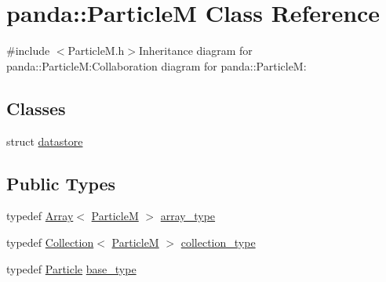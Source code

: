 \hypertarget{classpanda_1_1ParticleM}{
\section{panda::ParticleM Class Reference}
\label{classpanda_1_1ParticleM}
}


{\ttfamily \#include $<$ParticleM.h$>$}Inheritance diagram for panda::ParticleM:Collaboration diagram for panda::ParticleM:\subsection*{Classes}
\begin{DoxyCompactItemize}
\item 
struct \hyperlink{structpanda_1_1ParticleM_1_1datastore}{datastore}
\end{DoxyCompactItemize}
\subsection*{Public Types}
\begin{DoxyCompactItemize}
\item 
typedef \hyperlink{classpanda_1_1Array}{Array}$<$ \hyperlink{classpanda_1_1ParticleM}{ParticleM} $>$ \hyperlink{classpanda_1_1ParticleM_a1ba36e35f5cd6a26decfbaa815678d2a}{array\_\-type}
\item 
typedef \hyperlink{classpanda_1_1Collection}{Collection}$<$ \hyperlink{classpanda_1_1ParticleM}{ParticleM} $>$ \hyperlink{classpanda_1_1ParticleM_ae39fbe234c21960d067e8790541d0d68}{collection\_\-type}
\item 
typedef \hyperlink{classpanda_1_1Particle}{Particle} \hyperlink{classpanda_1_1ParticleM_a134d640b78531bc47ddb19ba490de07d}{base\_\-type}
\end{DoxyCompactItemize}

